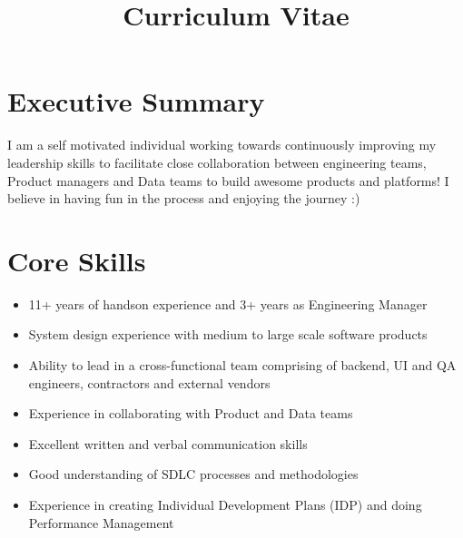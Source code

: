 \documentclass[11pt,a4paper,sans]{moderncv} %
\title{Curriculum Vitae}
\begin{document}
\makecvtitle %

\section{Executive Summary}
I am a self motivated individual working towards continuously improving my leadership skills to facilitate close collaboration between engineering teams, Product managers and Data teams to build awesome products and platforms! I believe in having fun in the process and enjoying the journey :)

\section{Core Skills}
\begin{multicols}{2}
    \begin{itemize}
        \item 11+ years of handson experience and 3+ years as Engineering Manager
        \item System design experience with medium to large scale software products
        \item Ability to lead in a cross-functional team comprising of backend, UI and QA engineers, contractors and external vendors
        \item Experience in collaborating with Product and Data teams
        \item Excellent written and verbal communication skills
        \item Good understanding of SDLC processes and methodologies
        \item Experience in creating Individual Development Plans (IDP) and doing Performance Management
    \end{itemize}
\end{multicols}

\end{document}
